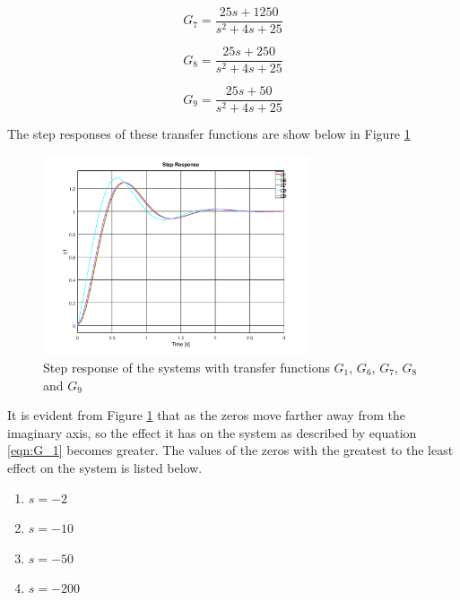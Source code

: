 \documentclass[12pt, a4paper]{article}
\begin{document}
				\begin{equation}
					G_7 = \frac{25s +1250}{s^2+4s+25}
					\label{eqn:G_7}
				\end{equation}

				\begin{equation}
					G_8 = \frac{25s +250}{s^2+4s+25}
					\label{eqn:G_8}
				\end{equation}

				\begin{equation}
					G_9 = \frac{25s +50}{s^2+4s+25}
					\label{eqn:G_9}
				\end{equation}

				The step responses of these transfer functions are show below in Figure \ref{fig:step_pre_2}

				\begin{figure}[H]
					\centering
					\includegraphics[width=0.7\textwidth]{Images/step_pre_2.png}
					\caption{Step response of the systems with transfer functions $G_1$, $G_6$, $G_7$, $G_8$ and $G_9$}
					\label{fig:step_pre_2}
				\end{figure}

				It is evident from Figure \ref{fig:step_pre_2} that as the zeros move farther away from the imaginary axis, so the effect it has on the system as described by equation \eqref{eqn:G_1} becomes greater. The values of the zeros with the greatest to the least effect on the system is listed below.
				\begin{enumerate}
	 				\item $s=-2$
	 				\item $s=-10$
	 				\item $s=-50$
	 				\item $s=-200$
	 			\end{enumerate}
			
\end{document}
